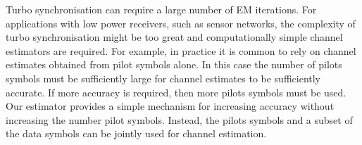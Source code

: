 \documentclass[journal]{IEEEtran}
\begin{document}
Turbo synchronisation can require a large number of EM iterations.  For applications with low power receivers, such as sensor networks, the complexity of turbo synchronisation might be too great and computationally simple channel estimators are required.  For example, in practice it is common to rely on channel estimates obtained from pilot symbols alone.  In this case the number of pilots symbols must be sufficiently large for channel estimates to be sufficiently accurate.  If more accuracy is required, then more pilots symbols must be used.  Our estimator provides a simple mechanism for increasing accuracy without increasing the number pilot symbols.  Instead, the pilots symbols and a subset of the data symbols can be jointly used for channel estimation.  %


\end{document}

